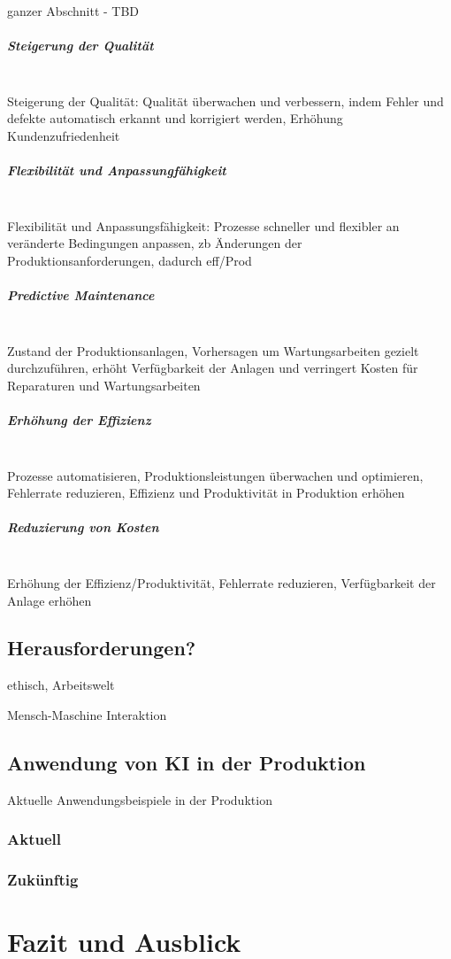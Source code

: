\documentclass[a4paper,12pt, german]{report}
\begin{document}
ganzer Abschnitt - TBD 

\paragraph{Steigerung der Qualität} $ $ \\ 
Steigerung der Qualität: Qualität überwachen und verbessern, indem Fehler und defekte automatisch erkannt und korrigiert werden, Erhöhung Kundenzufriedenheit

\paragraph{Flexibilität und Anpassungfähigkeit} $ $ \\ 
Flexibilität und Anpassungsfähigkeit: Prozesse schneller und flexibler an veränderte Bedingungen anpassen, zb Änderungen der Produktionsanforderungen, dadurch eff/Prod

\paragraph{Predictive Maintenance} $ $ \\ 
Zustand der Produktionsanlagen, Vorhersagen um Wartungsarbeiten gezielt durchzuführen, erhöht Verfügbarkeit der Anlagen und verringert Kosten für Reparaturen und Wartungsarbeiten

\paragraph{Erhöhung der Effizienz} $ $ \\ 
Prozesse automatisieren, Produktionsleistungen überwachen und optimieren, Fehlerrate reduzieren, Effizienz und Produktivität in Produktion erhöhen

\paragraph{Reduzierung von Kosten} $ $ \\ 
Erhöhung der Effizienz/Produktivität, Fehlerrate reduzieren, Verfügbarkeit der Anlage erhöhen

\section{Herausforderungen?}
ethisch, Arbeitswelt

Mensch-Maschine Interaktion

\section{Anwendung von KI in der Produktion}
Aktuelle Anwendungsbeispiele in der Produktion
\subsection{Aktuell}
\subsection{Zukünftig}


\chapter{Fazit und Ausblick}

\listoffigures

\clearpage




\appendix
\end{document}
